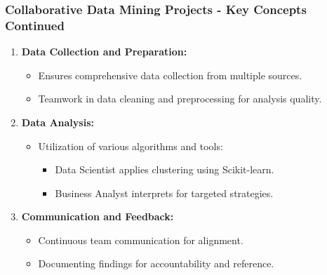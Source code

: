 \documentclass[aspectratio=169]{beamer}
\begin{document}
\begin{frame}[fragile]
    \frametitle{Collaborative Data Mining Projects - Key Concepts Continued}
    \begin{enumerate}[resume]
        \item \textbf{Data Collection and Preparation:}
        \begin{itemize}
            \item Ensures comprehensive data collection from multiple sources.
            \item Teamwork in data cleaning and preprocessing for analysis quality.
        \end{itemize}
        
        \item \textbf{Data Analysis:}
        \begin{itemize}
            \item Utilization of various algorithms and tools:
            \begin{itemize}
                \item Data Scientist applies clustering using Scikit-learn.
                \item Business Analyst interprets for targeted strategies.
            \end{itemize}
        \end{itemize}
        
        \item \textbf{Communication and Feedback:}
        \begin{itemize}
            \item Continuous team communication for alignment.
            \item Documenting findings for accountability and reference.
        \end{itemize}
    \end{enumerate}
\end{frame}
\end{document}
